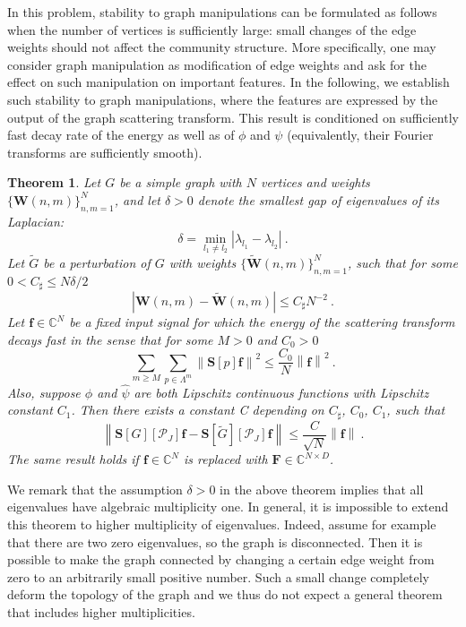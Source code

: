 \documentclass{article}
\newtheorem{theorem}{Theorem}[section]
\def\l{\lambda}
\def\CC{\mathbb{C}}
\def\cP{\mathcal{P}}
\def\tG{\tilde{G}}
\def\BF{\boldsymbol{F}}
\def\BS{\boldsymbol{S}}
\def\BW{\boldsymbol{W}}
\def\Bf{\boldsymbol{f}}
\newcommand{\abs}[1]{\left| #1 \right|}
\newcommand{\norm}[1]{\left\lVert#1\right\rVert}
\begin{document}
{In this problem, stability to graph manipulations can be formulated as follows when the number of vertices is sufficiently large: small changes of the edge weights should not affect the community structure.
More specifically, one may consider graph manipulation as modification of edge weights and ask for the effect on such manipulation on important features. In the following, we establish such stability to graph manipulations, where the features are expressed by the output of the graph scattering transform. This result is conditioned on sufficiently fast decay rate of the energy as well as of $\phi$ and $\psi$ (equivalently, their Fourier transforms are sufficiently smooth).
\begin{theorem}\label{thm:weightperturb}
Let $G$ be a simple graph with $N$ vertices and weights $\{\BW(n,m)\}_{n,m=1}^N$, and let $\delta > 0$ denote the smallest gap of eigenvalues of its Laplacian:
\begin{equation*}
    \delta = \min_{{l_1} \neq {l_2}} \abs{\l_{l_1} - \l_{l_2}} ~.
\end{equation*}
Let $\tilde{G}$ be a perturbation of $G$ with weights $\{\tilde{\BW}(n,m)\}_{n,m=1}^N$, such that for some $0 < C_{\sharp} \leq N \delta/2$
\begin{equation}
\label{eq:weak_cond_in_thm}
    \abs{\BW(n,m) - \tilde{\BW}(n,m)} \leq C_{\sharp} N^{-2} ~.
\end{equation}
Let $\Bf \in \CC^N$ be a fixed input signal for which the energy of the scattering transform decays fast in the sense that for some $M > 0$ and $C_0 > 0$ 
\begin{equation}
\sum_{m \geq M} \sum_{p \in \Lambda^m} \norm{\BS[p] \Bf}^2 \leq \frac{C_0}{N} \norm{\Bf}^2 ~.
\end{equation}
Also, suppose $\hat{\phi}$ and $\hat{\psi}$ are both Lipschitz continuous functions with Lipschitz constant $C_1$.
Then there exists a constant C depending on $C_{\sharp}$, $C_0$, $C_1$, such that
\begin{equation}
\norm{\BS[G][\cP_J]\Bf-\BS[\tG][\cP_J]\Bf} \leq \frac{C}{\sqrt{N}} \norm{\Bf} ~.
\end{equation}
The same result holds if $\Bf \in \CC^N$ is replaced with $\BF \in \CC^{N \times D}$.
\end{theorem}
}

{We remark that the assumption $\delta > 0$ in the above theorem implies that all eigenvalues have algebraic multiplicity one. In general, it is impossible to extend this theorem to higher multiplicity of eigenvalues. Indeed, assume for example that there are two zero eigenvalues, so the graph is disconnected. Then it is possible to make the graph connected by changing a certain edge weight from zero to an arbitrarily small positive number. Such a small change completely deform the topology of the graph and we thus do not expect a general theorem that includes higher multiplicities.}
\end{document}
